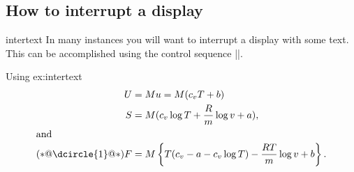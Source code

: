 %
%
 




\subsection{How to interrupt a display}

\begin{docCommand}{intertext}{}
 In many instances you will want to interrupt a display with some text. This can be accomplished using the control sequence |\intertext|.
 \end{docCommand}
 
 

\begin{texexample}{Using }{ex:intertext}
\begin{align}
U &= M u = M(c_v T + b)\\
S &= M(c_v  \log T + \frac{R}{m}  \log v + a),\\
\intertext{and} (*@\dcircle{1}@*)
F &= M \left\{T(c_v - a - c_v \log T) - \frac{RT}{m} \log v + b \right\}.
\end{align}
\end{texexample}

